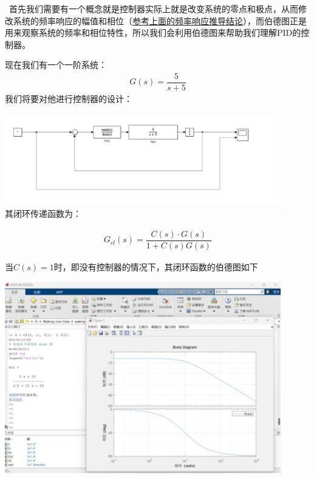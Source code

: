 \documentclass[UTF8,a4paper,12pt]{ctexart}
\begin{document}
    \begin{notitlebox}
      \ 首先我们需要有一个概念就是控制器实际上就是改变系统的零点和极点，从而修改系统的频率响应的幅值和相位（\hyperref[sec:part2]{参考上面的频率响应推导结论}），而伯德图正是用来观察系统的频率和相位特性，所以我们会利用伯德图来帮助我们理解PID的控制器。
      \begin{flushleft}
        现在我们有一个一阶系统：
        \begin{align*}
          G(s)=\dfrac{5}{s+5}
        \end{align*}
        我们将要对他进行控制器的设计：
        \par \includegraphics[width=12cm]{picture/matlab.png}
        \\其闭环传递函数为：
      \end{flushleft}
        \begin{align*}
          G_{cl}(s)=\dfrac{C(s)\cdot G(s)}{1+C(s)G(s)}
        \end{align*}
        \begin{center}
        \end{center}
      \begin{flushleft}
        当$C(s)=1$时，即没有控制器的情况下，其闭环函数的伯德图如下
        \par \includegraphics[width=12cm]{picture/close_function.png}

\end{flushleft}
\end{notitlebox}
\end{document}
